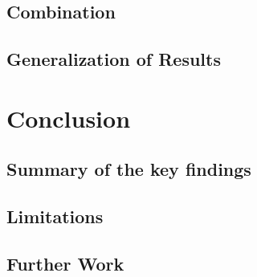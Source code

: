 \documentclass{article}
\begin{document}
\subsection{Combination}
\subsection{Generalization of Results}

\section{Conclusion}
\subsection{Summary of the key findings}
\subsection{Limitations}
\subsection{Further Work}









\appendix
\end{document}
